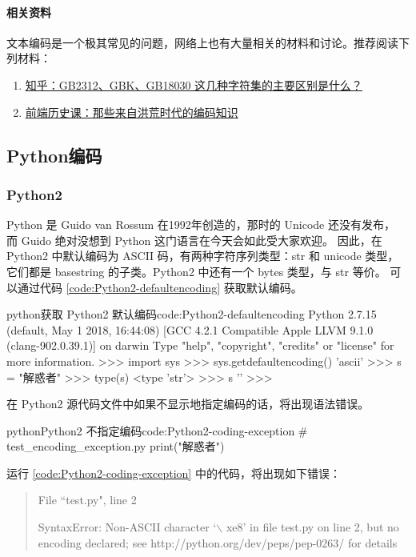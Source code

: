 \paragraph*{相关资料}
文本编码是一个极其常见的问题，网络上也有大量相关的材料和讨论。推荐阅读下列材料：
\begin{enumerate}
  \item \href{https://www.zhihu.com/question/19677619}{知乎：GB2312、GBK、GB18030 这几种字符集的主要区别是什么？}
  \item \href{http://web.jobbole.com/89552/}{前端历史课：那些来自洪荒时代的编码知识}
\end{enumerate}

\subsection{Python编码}

\subsubsection{Python2}
Python 是 Guido van Rossum 在1992年创造的，那时的 Unicode 还没有发布，
而 Guido 绝对没想到 Python 这门语言在今天会如此受大家欢迎。
因此，在 Python2 中默认编码为 ASCII 码，有两种字符序列类型：str 和 unicode 类型，
它们都是 basestring 的子类。Python2 中还有一个 bytes 类型，与 str 等价。
可以通过代码 \ref{code:Python2-defaultencoding} 获取默认编码。

\begin{jcode}{python}{获取 Python2 默认编码}{code:Python2-defaultencoding}
Python 2.7.15 (default, May  1 2018, 16:44:08)
[GCC 4.2.1 Compatible Apple LLVM 9.1.0 (clang-902.0.39.1)] on darwin
Type "help", "copyright", "credits" or "license" for more information.
>>> import sys
>>> sys.getdefaultencoding()
'ascii'
>>> s = "解惑者"
>>> type(s)
<type 'str'>
>>> s
''
>>>
\end{jcode}

在 Python2 源代码文件中如果不显示地指定编码的话，将出现语法错误。

\begin{jcode}{python}{Python2 不指定编码}{code:Python2-coding-exception}
# test_encoding_exception.py
print("解惑者")
\end{jcode}

运行 \ref{code:Python2-coding-exception} 中的代码，将出现如下错误：
\begin{quote}
File ``test.py", line 2

SyntaxError: Non-ASCII character `$\backslash$ xe8' in file test.py on line 2, but no encoding declared; see http://python.org/dev/peps/pep-0263/ for details
\end{quote}

